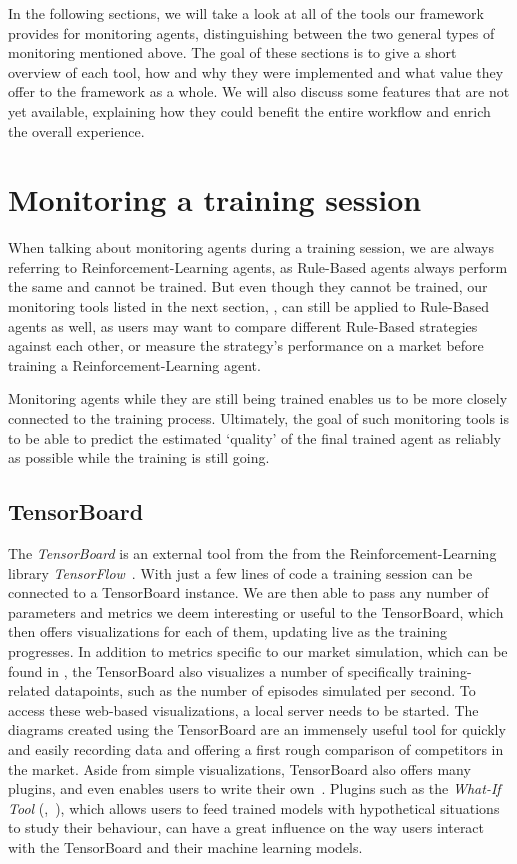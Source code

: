 In the following sections, we will take a look at all of the tools our framework provides for monitoring agents, distinguishing between the two general types of monitoring mentioned above. The goal of these sections is to give a short overview of each tool, how and why they were implemented and what value they offer to the framework as a whole. We will also discuss some features that are not yet available, explaining how they could benefit the entire workflow and enrich the overall experience.

\section{Monitoring a training session}

When talking about monitoring agents during a training session, we are always referring to Reinforcement-Learning agents, as Rule-Based agents always perform the same and cannot be trained. But even though they cannot be trained, our monitoring tools listed in the next section, , can still be applied to Rule-Based agents as well, as users may want to compare different Rule-Based strategies against each other, or measure the strategy's performance on a market before training a Reinforcement-Learning agent.

Monitoring agents while they are still being trained enables us to be more closely connected to the training process. Ultimately, the goal of such monitoring tools is to be able to predict the estimated `quality' of the final trained agent as reliably as possible while the training is still going.

\subsection*{TensorBoard}\label{subsec:TensorBoard}

The \emph{TensorBoard} is an external tool from the from the Reinforcement-Learning library \emph{TensorFlow}~\cite{TensorFlow}. With just a few lines of code a training session can be connected to a TensorBoard instance. We are then able to pass any number of parameters and metrics we deem interesting or useful to the TensorBoard, which then offers visualizations for each of them, updating live as the training progresses. In addition to metrics specific to our market simulation, which can be found in , the TensorBoard also visualizes a number of specifically training-related datapoints, such as the number of episodes simulated per second. To access these web-based visualizations, a local server needs to be started. The diagrams created using the TensorBoard are an immensely useful tool for quickly and easily recording data and offering a first rough comparison of competitors in the market. Aside from simple visualizations, TensorBoard also offers many plugins, and even enables users to write their own~\cite{TensorBoardPlugins}. Plugins such as the \emph{What-If Tool} (\cite{WhatIfTool},~\cite{WhatIfToolWeb}), which allows users to feed trained models with hypothetical situations to study their behaviour, can have a great influence on the way users interact with the TensorBoard and their machine learning models.

